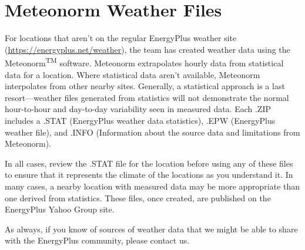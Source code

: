 \section{Meteonorm Weather Files}\label{meteonorm-weather-files}

For locations that aren't on the regular EnergyPlus weather site (\url{https://energyplus.net/weather}), the team has created weather data using the Meteonorm\textsuperscript{TM} software.
Meteonorm extrapolates hourly data from statistical data for a location. Where statistical data aren't available, Meteonorm interpolates from other nearby sites.
Generally, a statistical approach is a last resort---weather files generated from statistics will not demonstrate the normal hour-to-hour and day-to-day variability seen in measured data.
Each .ZIP includes a .STAT (EnergyPlus weather data statistics), .EPW (EnergyPlus weather file), and .INFO (Information about the source data and limitations from Meteonorm).

In all cases, review the .STAT file for the location before using any of these files to ensure that it represents the climate of the locations as you understand it.
In many cases, a nearby location with measured data may be more appropriate than one derived from statistics.
These files, once created, are published on the EnergyPlus Yahoo Group site.

As always, if you know of sources of weather data that we might be able to share with the EnergyPlus community, please contact us.
